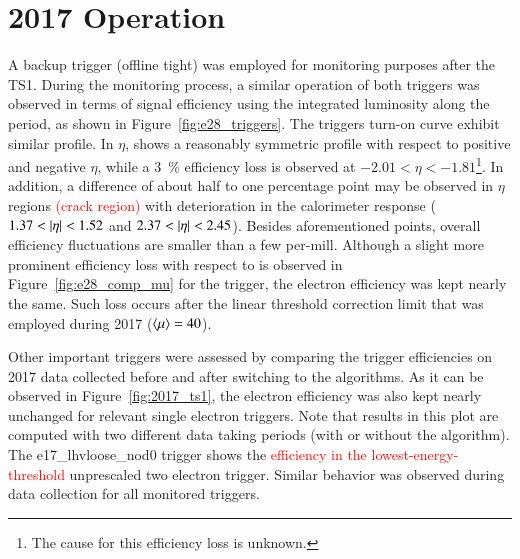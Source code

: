 \section{2017 Operation}\label{ssec:2017_ringer_operation}


A backup trigger (offline tight) was employed for
monitoring purposes after the TS1. During the monitoring process, a similar
operation of both triggers was observed in terms of signal efficiency using the
integrated luminosity along the period, as shown in
Figure~\ref{fig:e28_triggers}. The triggers
turn-on curve exhibit similar profile. In $\eta$, \rnn{} shows a reasonably symmetric
profile with respect to positive and negative $\eta$, while a
\SI{3}{\%} efficiency loss is observed at $-2.01<\eta<-1.81$\footnote{The cause for this efficiency loss is unknown.}. In addition, a difference of about
half to one percentage point may be observed in $\eta$ regions \textcolor{red}{(crack region)} with deterioration in the calorimeter
response ($1.37 < \abseta < 1.52$ and $2.37 < \abseta < 2.45$). Besides
aforementioned points, overall efficiency fluctuations are smaller than a few
per-mill. Although a slight more prominent efficiency loss with respect to
\avgmu{} is observed in Figure~\ref{fig:e28_comp_mu} for the \rnn{} trigger, the
electron efficiency was kept nearly the same. Such loss occurs after the
linear threshold correction limit that was employed during 2017 ($\langle \mu \rangle=40$).

Other important triggers were assessed by comparing the trigger efficiencies on
2017 data collected before and after switching to the \rnn{} algorithms.  As it can be
observed in Figure~\ref{fig:2017_ts1}, the electron efficiency was also kept
nearly unchanged for relevant single electron triggers. Note that results in
this plot are computed with two different data taking periods (with or
without the \rnn{} algorithm). The e17\_lhvloose\_nod0 trigger shows the
\textcolor{red}{efficiency in the lowest-energy-threshold} 
unprescaled two electron trigger.
Similar behavior was observed during data collection for all monitored triggers.


